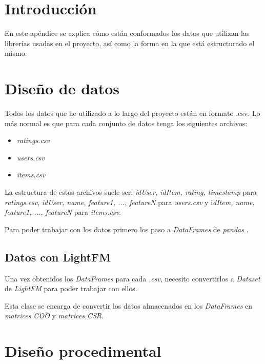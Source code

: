 
\section{Introducción}
En este apéndice se explica cómo están conformados los datos que utilizan las librerías usadas en el proyecto, así como la forma en la que está estructurado el mismo.

\section{Diseño de datos}
Todos los datos que he utilizado a lo largo del proyecto están en formato .csv. Lo más normal es que para cada conjunto de datos tenga los siguientes archivos:
\begin{itemize}
\tightlist
\item \textit{ratings.csv} 
\item \textit{users.csv}
\item \textit{items.csv}
\end{itemize}
La estructura de estos archivos suele ser: \textit{idUser, idItem, rating, timestamp} para \textit{ratings.csv}, \textit{idUser, name, feature1, ..., featureN} para \textit{users.csv} y i\textit{dItem, name, feature1, ..., featureN} para \textit{items.csv}.

Para poder trabajar con los datos primero los paso a \textit{DataFrames} de \textit{pandas} \cite{dataframes}.

\subsection{Datos con LightFM}\label{datos-lightfm}
Una vez obtenidos los \textit{DataFrames} para cada \textit{.csv}, necesito convertirlos a \textit{Dataset} de \textit{LightFM} \cite{dataset-lightfm} para poder trabajar con ellos.

Esta clase se encarga de convertir los datos almacenados en los \textit{DataFrames} en \textit{matrices COO} y \textit{matrices CSR}.

\section{Diseño procedimental}

